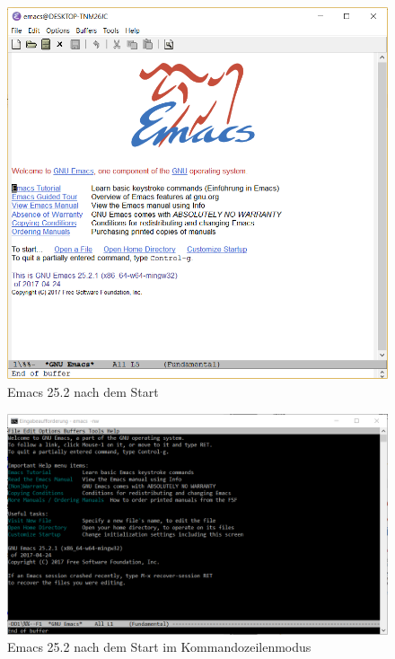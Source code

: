 \documentclass[12pt,ngerman]{scrbook}
\begin{document}
\begin{figure}
\begin{center}
\includegraphics[width=\textwidth]{Bilder/emacs-01}
\caption{Emacs 25.2 nach dem Start}\label{fig:emacs-01}
\end{center}
\end{figure}

\begin{figure}
\begin{center}
\includegraphics[width=\textwidth]{Bilder/emacs-02}
\caption{Emacs 25.2 nach dem Start im Kommandozeilenmodus}\label{fig:emacs-02}
\end{center}
\end{figure}
\end{document}
